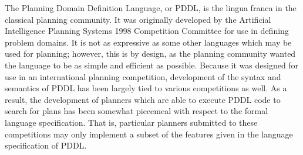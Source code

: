 The Planning Domain Definition Language, or PDDL, is the lingua franca in the classical planning community. It was originally developed by the Artificial Intelligence Planning Systems 1998 Competition Committee for use in defining problem domains. It is not as expressive as some other languages which may be used for planning; however, this is by design, as the planning community wanted the language to be as simple and efficient as possible. Because it was designed for use in an international planning competition, development of the syntax and semantics of PDDL has been largely tied to various competitions as well. As a result, the development of planners which are able to execute PDDL code to search for plans has been somewhat piecemeal with respect to the formal language specification. That is, particular planners submitted to these competitions may only implement a subset of the features given in the language specification of PDDL. 